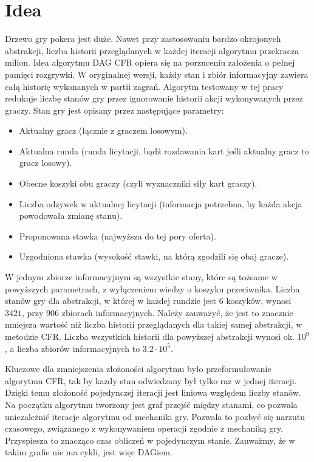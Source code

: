 \documentclass[magisterska]{pracamgr}
\begin{document}
\section{Idea}

Drzewo gry pokera jest duże. Nawet przy zastosowaniu bardzo okrojonych abstrakcji, liczba historii przeglądanych w każdej
iteracji algorytmu przekracza milion. Idea algorytmu DAG CFR opiera się na porzuceniu założenia o pełnej pamięci rozgrywki.
W oryginalnej wersji, każdy stan i zbiór informacyjny zawiera całą historię wykonanych w partii zagrań. Algorytm testowany
w tej pracy redukuje liczbę stanów gry przez ignorowanie historii akcji wykonywanych
przez graczy. Stan gry jest opisany przez następujące parametry: \\

\begin{itemize}
\item Aktualny gracz (łącznie z graczem losowym).
\item Aktualna runda (runda licytacji, bądź rozdawania kart jeśli aktualny gracz to gracz losowy).
\item Obecne koszyki obu graczy (czyli wyznaczniki siły kart graczy).
\item Liczba odzywek w aktualnej licytacji (informacja potrzebna, by każda akcja powodowała zmianę stanu).
\item Proponowana stawka (najwyższa do tej pory oferta).
\item Uzgodniona stawka (wysokość stawki, na którą zgodzili się obaj gracze).
\end{itemize}

\noindent
W jednym zbiorze informacyjnym są wszystkie stany, które są tożsame w powyższych parametrach, z wyłączeniem
wiedzy o koszyku przeciwnika. Liczba stanów gry dla abstrakcji, w której w każdej rundzie jest $6$ koszyków,
wynosi $3421$, przy $906$ zbiorach informacyjnych. Należy zauważyć, że jest to znacznie mniejsza wartość niż
liczba historii przeglądanych dla takiej samej abstrakcji, w metodzie CFR. Liczba wszystkich historii dla
powyższej abstrakcji wynosi ok. $10^9$, a liczba zbiorów informacyjnych to $3.2 \cdot 10^5$.


\noindent
Kluczowe dla zmniejszenia złożoności algorytmu było przeformułowanie algorytmu CFR, tak by każdy
stan odwiedzany był tylko raz w jednej iteracji. Dzięki temu złożoność pojedynczej iteracji jest
liniowa względem liczby stanów. Na początku algorytmu tworzony jest graf przejść między
stanami, co pozwala uniezależnić iteracje algorytmu od mechaniki gry. Pozwala to pozbyć się narzutu czasowego,
związanego z wykonywaniem operacji zgodnie z mechaniką gry. Przyspiesza to znacząco
czas obliczeń w pojedynczym stanie. Zauważmy, że w takim grafie nie ma cykli, jest więc DAGiem.
\end{document}
